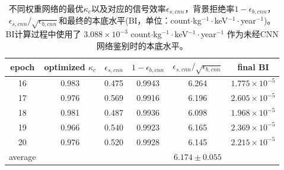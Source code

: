 \begin{table}[hbt]
    \centering
    \begin{tabular}{cccccc}
      \\\hline
      epoch & optimized $\kappa_c$ & $\epsilon_{s,cnn}$ & $ 1-\epsilon_{b,cnn}$ &$\epsilon_{s,cnn}/\sqrt{\epsilon_{b,cnn}}$ & final BI\\\hline
      16 & 0.983 & 0.475 & 0.9943 & 6.264 & $1.775\times10^{-5}$ \\
      17 & 0.976 & 0.569 & 0.9916 & 6.196 & $2.605\times10^{-5}$ \\
      18 & 0.981 & 0.487 & 0.9936 & 6.098 & $1.968\times10^{-5}$ \\
      19 & 0.966 & 0.540 & 0.9923 & 6.165 & $2.369\times10^{-5}$ \\
      20 & 0.976 & 0.520 & 0.9928 & 6.145 & $2.215\times10^{-5}$ \\\hline
      average &  &  &  & $6.174\pm0.055$ \\\hline
    \end{tabular}
    \caption{不同权重网络的最优$\kappa_c$以及对应的信号效率$\epsilon_{s,cnn}$，背景拒绝率$1-\epsilon_{b,cnn}$，$\epsilon_{s,cnn}/\sqrt{\epsilon_{b,cnn}}$和最终的本底水平(BI，单位：count$\cdot$kg$^{-1}\cdot$keV$^{-1}\cdot$year$^{-1}$)。BI计算过程中使用了 $3.088\times10^{-3}$ count$\cdot$kg$^{-1}\cdot$keV$^{-1}\cdot$year$^{-1}$ 作为未经CNN网络鉴别时的本底水平。}
    \label{tab:efficiencies}
  \end{table}
  

